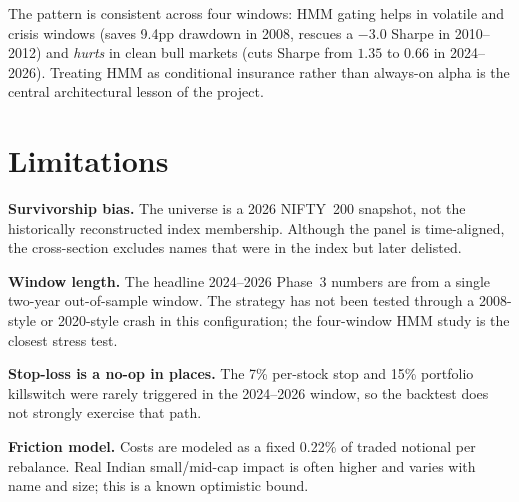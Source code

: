 \documentclass[conference]{IEEEtran}
\begin{document}
\begin{table}[ht]
\centering
\caption{HMM-conditioned vs flat sizing, four windows.}
\label{tab:hmm}
\end{table}

The pattern is consistent across four windows: HMM gating helps in volatile
and crisis windows (saves 9.4pp drawdown in 2008, rescues a $-3.0$ Sharpe in
2010--2012) and \emph{hurts} in clean bull markets (cuts Sharpe from $1.35$ to
$0.66$ in 2024--2026). Treating HMM as conditional insurance rather than
always-on alpha is the central architectural lesson of the project.

\section{Limitations}
\textbf{Survivorship bias.} The universe is a 2026 NIFTY~200 snapshot, not the
historically reconstructed index membership. Although the panel is
time-aligned, the cross-section excludes names that were in the index but
later delisted.

\textbf{Window length.} The headline 2024--2026 Phase~3 numbers are from a
single two-year out-of-sample window. The strategy has not been tested
through a 2008-style or 2020-style crash in this configuration; the
four-window HMM study is the closest stress test.

\textbf{Stop-loss is a no-op in places.} The 7\% per-stock stop and 15\%
portfolio killswitch were rarely triggered in the 2024--2026 window, so the
backtest does not strongly exercise that path.

\textbf{Friction model.} Costs are modeled as a fixed 0.22\% of traded
notional per rebalance. Real Indian small/mid-cap impact is often higher and
varies with name and size; this is a known optimistic bound.
\end{document}
